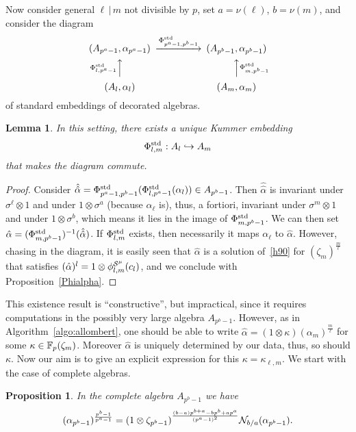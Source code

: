 \documentclass{sig-alternate}
\newtheorem{proposition}[theorem]{Proposition}
\newtheorem{lemma}[theorem]{Lemma}
\begin{document}
Now consider general $\ell\,|\,m$ not divisible by $p$,
set $a=\nu(\ell)$, $b=\nu(m)$, and consider the diagram
\begin{equation*}
\label{3cotes}
\begin{CD}
(A_{p^a-1},\alpha_{p^a-1}) @>{\embedalg{p^a-1}{p^b-1}}>> (A_{p^b-1},\alpha_{p^b-1}) \\
@A{\embedalg{\ell}{p^a-1}}AA @AA{\embedalg{m}{p^b-1}}A\\
(A_\ell,\alpha_\ell) @. (A_m,\alpha_m)
\end{CD}
\end{equation*}
of standard embeddings of decorated algebras.
\begin{lemma}
In this setting, there exists a unique Kummer embedding
\[ {\Phi^{\textrm{std}}_{{l},{m}}}:A_l\hookrightarrow A_m \]
that makes the diagram commute.
\end{lemma}
\begin{proof}
Consider $\hat{\hat\alpha}={\Phi^{\textrm{std}}_{{p^a-1},{p^b-1}}}({\Phi^{\textrm{std}}_{{l},{p^a-1}}}(\alpha_l))\in A_{p^b-1}$.
Then $\hat{\hat\alpha}$ is invariant under $\sigma^\ell\otimes1$ and
under $1\otimes\sigma^a$ (because $\alpha_\ell$ is),
thus, a fortiori, invariant under $\sigma^m\otimes1$ and
under $1\otimes\sigma^b$, which means it lies in the image
of ${\Phi^{\textrm{std}}_{{m},{p^b-1}}}$.
We can then set $\hat\alpha=({\Phi^{\textrm{std}}_{{m},{p^b-1}}})^{-1}(\hat{\hat\alpha})$.
If ${\Phi^{\textrm{std}}_{{l},{m}}}$ exists, then necessarily it maps $\alpha_\ell$
to $\hat\alpha$.
However, chasing in the diagram, it is easily seen that $\hat\alpha$ is
a solution of~\eqref{h90} for $(\zeta_m)^{\frac{m}{\ell}}$ that
satisfies $(\hat{\alpha})^l=1\otimes{\phi^{\mathcal{S}^\mu}_{{l},{m}}}(c_l)$,
and we conclude with Proposition~\ref{Phialpha}.
\end{proof}
This existence result is ``constructive'', but impractical,
since it requires computations in the possibly very large algebra $A_{p^b-1}$.
However, as in Algorithm~\ref{algo:allombert}, one should be able
to write $\hat{\alpha}=(1\otimes\kappa)(\alpha_m)^{\frac{m}{\ell}}$
for some $\kappa\in\mathbb{F}_{p}(\zeta_m)$. Moreover $\hat{\alpha}$ is uniquely
determined by our data, thus, so should $\kappa$.
Now our aim is to give an explicit expression for this $\kappa=\kappa_{\ell,m}$.
We start with the case of complete algebras.
\begin{proposition}
\label{key}
In the complete algebra $A_{p^b-1}$ we have
\[ (\alpha_{p^b-1})^{\frac{p^b-1}{p^a-1}}=(1\otimes\zeta_{p^b-1})^{\frac{(b-a)p^{b+a}-bp^b+ap^a}{(p^a-1)^2}}\mathcal{N}_{b/a}(\alpha_{p^b-1}).\]
\end{proposition}
\end{document}
